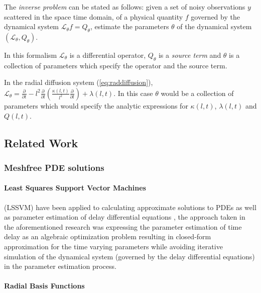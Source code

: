 The \emph{inverse problem} can be stated as follows: given a set of
noisy observations $y$ scattered in the space time domain, of a
physical quantity $f$ governed by the dynamical system
$\mathcal{L}_{\theta} f = Q_{\theta}$, estimate the parameters $\theta$ of the
dynamical system $(\mathcal{L}_{\theta}, Q_{\theta})$.

In this formalism $\mathcal{L}_{\theta}$ is a differential operator,
$Q_{\theta}$ is a \emph{source term} and $\theta$ is a collection of parameters
which specify the operator and the source term.

In the radial diffusion system (\ref{eq:raddiffusion}), $\mathcal{L}_{\theta} =
\frac{\partial}{\partial{t}} - l^2 \frac{\partial}{\partial{l}}\left( \frac{\kappa(l,
      t)}{l^{2}} \frac{\partial}{\partial{l}} \right) + \lambda(l,
  t)$. In this case $\theta$ would be a collection of parameters which
  would specify the analytic expressions for $\kappa(l,t)$,
  $\lambda(l,t)$ and $Q(l,t)$.

\subsection{Related Work}

\subsubsection*{Meshfree PDE solutions}

\paragraph{Least Squares Support Vector Machines}

(LSSVM) have been applied to calculating approximate solutions to PDEs
\citep{MEHRKANOON2015105,MEHRKANOON20122502} as well as
parameter estimation of delay differential equations
\citep{MEHRKANOON2014830}, the approach taken in the aforementioned
research \citep{MEHRKANOON2014830} was expressing the parameter
estimation of time delay as an algebraic optimization problem
resulting in closed-form approximation for the time varying parameters
while avoiding iterative simulation of the dynamical system (governed
by the delay differential equations) in the parameter estimation process.

\paragraph{Radial Basis Functions}

